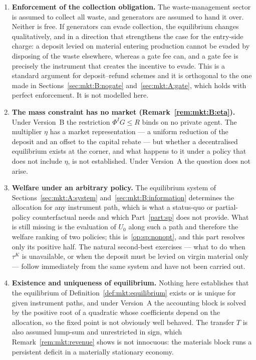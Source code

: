 \begin{enumerate}[label=\textbf{M\arabic*.},ref=M\arabic*,leftmargin=2.6em,itemsep=0.35em]

\item\label{op:mkt:dumping} \textbf{Enforcement of the collection obligation.} The waste-management
sector is assumed to collect all waste, and generators are assumed to hand it over. Neither is free.
If generators can evade collection, the equilibrium changes qualitatively, and in a direction that
strengthens the case for the entry-side charge: a deposit levied on material entering production
cannot be evaded by disposing of the waste elsewhere, whereas a gate fee can, and a gate fee is
precisely the instrument that creates the incentive to evade. This is a standard argument for
deposit--refund schemes and it is orthogonal to the one made in
Sections~\ref{sec:mkt:B:nogate} and~\ref{sec:mkt:A:gate}, which holds with perfect enforcement. It is
not modelled here.

\item\label{op:mkt:corner} \textbf{The mass constraint has no market
(Remark~\ref{rem:mkt:B:eta}).} Under Version~B the restriction $\Phi^IG\le R$ binds on no private
agent. The multiplier $\eta$ has a market representation --- a uniform reduction of the deposit and an
offset to the capital rebate --- but whether a decentralised equilibrium exists at the corner, and what
happens to it under a policy that does not include $\eta$, is not established. Under Version~A the
question does not arise.

\item\label{op:mkt:secondbest} \textbf{Welfare under an arbitrary policy.} The equilibrium system of
Sections~\ref{sec:mkt:A:system} and~\ref{sec:mkt:B:information} determines the allocation for any
instrument path, which is what a status-quo or partial-policy counterfactual needs and which
Part~\ref{part:sp} does not provide. What is still missing is the evaluation of $U_0$ along such a
path and therefore the welfare ranking of two policies; this is~\ref{op:sp:nonopt}, and this part
resolves only its positive half. The natural second-best exercises --- what to do when $\tau^K$ is
unavailable, or when the deposit must be levied on virgin material only --- follow immediately from
the same system and have not been carried out.

\item\label{op:mkt:existence} \textbf{Existence and uniqueness of equilibrium.} Nothing here
establishes that the equilibrium of Definition~\ref{def:mkt:equilibrium} exists or is unique for given
instrument paths, and under Version~A the accounting block is solved by the positive root of a
quadratic whose coefficients depend on the allocation, so the fixed point is not obviously well
behaved. The transfer $T$ is also assumed lump-sum and unrestricted in sign, which
Remark~\ref{rem:mkt:revenue} shows is not innocuous: the materials block runs a persistent deficit in a
materially stationary economy.


\end{enumerate}
